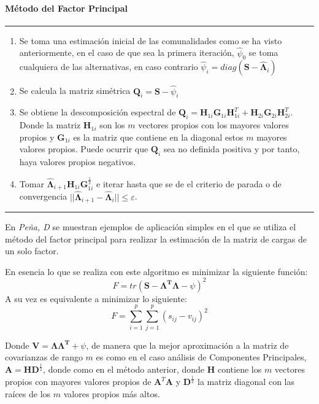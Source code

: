 \paragraph*{Método del Factor Principal}
\hrule
\begin{enumerate}
\item Se toma una estimación inicial de las comunalidades como se ha visto anteriormente, en el caso de que sea la primera iteración, $\hat{\psi}_0$ se toma cualquiera de las alternativas, en caso contrario $\hat{\psi}_i=diag(\textbf{S}-\hat{\mathbf{\Lambda}}_{i})$
\item Se calcula la matriz simétrica $\textbf{Q}_i=\textbf{S}-\hat{\psi}_i$
\item Se obtiene la descomposición espectral de $\textbf{Q}_i=\textbf{H}_{1i}\textbf{G}_{1i}\textbf{H}_{1i}^T+\textbf{H}_{2i}\textbf{G}_{2i}\textbf{H}_{2i}^T$. Donde la matriz $\textbf{H}_{1i}$ son los $m$ vectores propios con los mayores valores propios y $\textbf{G}_{1i}$ es la matriz que contiene en la diagonal estos $m$ mayores valores propios. Puede ocurrir que $\textbf{Q}_i$ sea no definida positiva y por tanto, haya valores propios negativos. 
\item Tomar $\hat{\mathbf{\Lambda}}_{i+1}\textbf{H}_{1i}\textbf{G}_{1i}^{\frac{1}{2}}$ e iterar hasta que se de el criterio de parada o de convergencia $||\hat{\mathbf{\Lambda}}_{i+1}-\hat{\mathbf{\Lambda}}_{i}||\leq \varepsilon$.
\end{enumerate}
\hrule

\noindent En \emph{Peña, D}\cite{Peña 2002} se muestran ejemplos de aplicación simples en el que se utiliza el método del factor principal para realizar la estimación de la matriz de cargas de un solo factor.

\noindent En  esencia lo que se realiza con este algoritmo es minimizar la siguiente función:
\begin{equation}
F=tr(\textbf{S}-\mathbf{\mathbf{\Lambda}^T\mathbf{\Lambda}}-\psi)^2
\end{equation}
A su vez es equivalente a minimizar lo siguiente: 
\begin{equation}
F=\sum_{i=1}^p\sum_{j=1}^p(s_{ij}-v_{ij})^2
\end{equation}

\noindent Donde $\mathbf{V}=\mathbf{\mathbf{\Lambda}\mathbf{\Lambda}^T}+\psi$, de manera que la mejor aproximación a la matriz de covarianzas de rango $m$ es como en el caso análisis de Componentes Principales, $\textbf{A}=\textbf{H}\textbf{D}^{\frac{1}{2}}$, donde como en el método anterior, donde $\textbf{H}$ contiene los $m$ vectores  propios con mayores valores propios de $\textbf{A}^T\textbf{A}$ y $\textbf{D}^\frac{1}{2}$ la matriz diagonal con las raíces de los $m$ valores propios más altos. 

